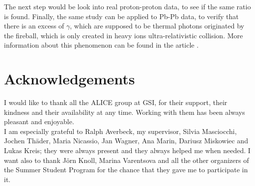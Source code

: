 \documentclass[a4paper,twocolumn,gsifonts,twoside]{gsipaper}
\begin{document}
The next step would be look into real proton-proton data, to see if the same ratio is found.
Finally, the same study can be applied to Pb-Pb data, to verify that there is an excess of $\gamma$, which are supposed to be 
thermal photons originated by the fireball, which is only created in heavy ions ultra-relativistic collision.  
More information about this phenomenon can be found in the article \cite{Masciocchi:2011fu}.

\section*{Acknowledgements}
I would like to thank all the ALICE group at GSI, for their support, their kindness and their availability at any time.
Working with them has been always pleasant and enjoyable.\\
I am especially grateful to Ralph Averbeck, my supervisor, Silvia Masciocchi, Jochen Th\"{a}der, Maria Nicassio, Jan Wagner, Ana Marin,
Dariusz Miskowiec and Lukas Kreis; they were always present and they always helped me when needed.
I want also to thank J\"{o}rn Knoll, Marina Varentsova and all the other organizers of the Summer Student Program for the chance 
that they gave me to participate in it. 
\end{document}
